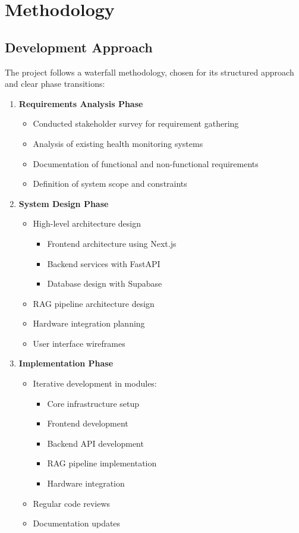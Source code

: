 \section{Methodology}

\subsection{Development Approach}
The project follows a waterfall methodology, chosen for its structured approach and clear phase transitions:

\begin{enumerate}
    \item \textbf{Requirements Analysis Phase}
    \begin{itemize}
        \item Conducted stakeholder survey for requirement gathering
        \item Analysis of existing health monitoring systems
        \item Documentation of functional and non-functional requirements
        \item Definition of system scope and constraints
    \end{itemize}

    \item \textbf{System Design Phase}
    \begin{itemize}
        \item High-level architecture design
        \begin{itemize}
            \item Frontend architecture using Next.js
            \item Backend services with FastAPI
            \item Database design with Supabase
        \end{itemize}
        \item RAG pipeline architecture design
        \item Hardware integration planning
        \item User interface wireframes
    \end{itemize}

    \item \textbf{Implementation Phase}
    \begin{itemize}
        \item Iterative development in modules:
        \begin{itemize}
            \item Core infrastructure setup
            \item Frontend development
            \item Backend API development
            \item RAG pipeline implementation
            \item Hardware integration
        \end{itemize}
        \item Regular code reviews
        \item Documentation updates
    \end{itemize}


\end{enumerate}
